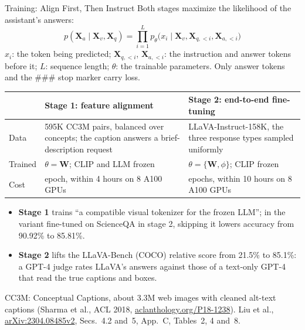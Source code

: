 \begin{frame}{Training: Align First, Then Instruct}
  \footnotesize
  Both stages maximize the likelihood of the assistant's answers:
  \[ p(\mathbf{X}_a \mid \mathbf{X}_v, \mathbf{X}_q) = \prod_{i=1}^{L} p_{\theta}\big(x_i \mid \mathbf{X}_v, \mathbf{X}_{q,<i}, \mathbf{X}_{a,<i}\big) \]
  $x_i$: the token being predicted; $\mathbf{X}_{q,<i}$, $\mathbf{X}_{a,<i}$: the instruction and answer tokens before it; $L$: sequence length; $\theta$: the trainable parameters. Only answer tokens and the \#\#\# stop marker carry loss.

  \vspace{0.2em}
  {\centering\scriptsize\setlength{\tabcolsep}{4pt}
  \begin{tabular}{>{\raggedright\arraybackslash}p{1.2cm} >{\raggedright\arraybackslash}p{6.0cm} >{\raggedright\arraybackslash}p{5.8cm}}
    \toprule
     & \textbf{Stage 1: feature alignment} & \textbf{Stage 2: end-to-end fine-tuning} \\
    \midrule
    Data & 595K CC3M pairs, balanced over concepts; the caption answers a brief-description request & LLaVA-Instruct-158K, the three response types sampled uniformly \\
    \addlinespace[0.15em]
    Trained & $\theta = \mathbf{W}$; CLIP and LLM frozen & $\theta = \{\mathbf{W}, \phi\}$; CLIP frozen \\
    \addlinespace[0.15em]
    Cost & 1 epoch, within 4 hours on 8 A100 GPUs & 3 epochs, within 10 hours on 8 A100 GPUs \\
    \bottomrule
  \end{tabular}\par}
  \vspace{0.2em}
  \begin{itemize}\itemsep0.25em
    \item \textbf{Stage 1} trains ``a compatible visual tokenizer for the frozen LLM''; in the variant fine-tuned on ScienceQA in stage 2, skipping it lowers accuracy from 90.92\% to 85.81\%.
    \item \textbf{Stage 2} lifts the LLaVA-Bench (COCO) relative score from 21.5\% to 85.1\%: a GPT-4 judge rates LLaVA's answers against those of a text-only GPT-4 that read the true captions and boxes.
  \end{itemize}
  \vspace{0.1em}
  {\scriptsize CC3M: Conceptual Captions, about 3.3M web images with cleaned alt-text captions (Sharma et al., ACL 2018, \href{https://aclanthology.org/P18-1238/}{aclanthology.org/P18-1238}). Liu et al., \href{https://arxiv.org/abs/2304.08485v2}{arXiv:2304.08485v2}, Secs.~4.2 and~5, App.~C, Tables~2, 4 and~8.\par}
\end{frame}

